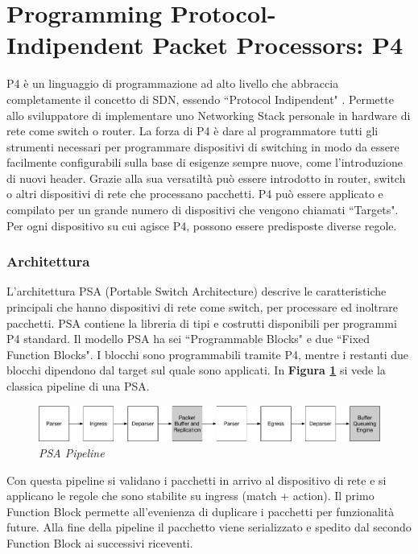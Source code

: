 \pagebreak
{}
\section*{Programming Protocol-Indipendent Packet Processors: P4}

P4 è un linguaggio di programmazione ad alto livello che abbraccia completamente il concetto di SDN, essendo ``Protocol Indipendent" \cite{noauthor_p4_nodate}. Permette allo sviluppatore di implementare uno Networking Stack personale in hardware di rete come switch o router. La forza di P4 è dare al programmatore tutti gli strumenti necessari per programmare dispositivi di switching in modo da essere facilmente configurabili sulla base di esigenze sempre nuove, come l'introduzione di nuovi header. Grazie alla sua versatiltà può essere introdotto in router, switch o altri dispositivi di rete che processano pacchetti. P4 può essere applicato e  compilato per un grande numero di dispositivi che vengono chiamati ``Targets". Per ogni dispositivo su cui agisce P4, possono essere predisposte diverse regole.

\subsubsection*{Architettura}
L'architettura PSA (Portable Switch Architecture) \cite{noauthor_p4_2022} descrive le caratteristiche principali che hanno dispositivi di rete come switch, per processare ed inoltrare pacchetti. PSA contiene la libreria di tipi e costrutti disponibili per programmi P4 standard.
Il modello PSA ha sei ``Programmable Blocks" e due ``Fixed Function Blocks". I blocchi sono programmabili tramite P4, mentre i restanti due blocchi dipendono dal target sul quale sono applicati. In \textbf{{Figura \ref{fig:pipeline_p4}}}
 si vede la classica pipeline di una PSA.
\vspace{1cm}
\begin{figure}[h]
\includegraphics[scale=0.4]{images/pipeline_p4.png}
\centering
\caption{\textit{PSA Pipeline}}
\label{fig:pipeline_p4}
\end{figure}
\leavevmode\newline
Con questa pipeline si validano i pacchetti in arrivo al dispositivo di rete e si applicano le regole che sono stabilite su ingress (match + action). Il primo Function Block permette all'evenienza di duplicare i pacchetti per funzionalità future. Alla fine della pipeline il pacchetto viene serializzato e spedito dal secondo Function Block ai successivi riceventi.
